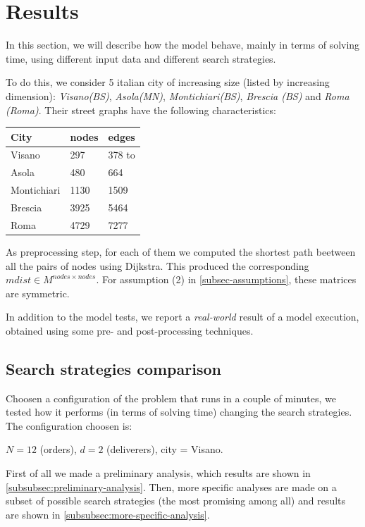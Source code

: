 \documentclass[10pt]{article}
\begin{document}
	\section{Results}
	\label{Results}

	In this section, we will describe how the model behave, mainly in terms of solving
	time, using different input data and different search strategies.

	To do this, we consider 5 italian city of increasing size (listed by increasing dimension): 
	\textit{Visano(BS)}, \textit{Asola(MN)}, \textit{Montichiari(BS)}, \textit{Brescia (BS)} and \textit{Roma (Roma)}.
	Their street graphs have the following characteristics:%
	\begin{table}[h]
		\centering
		\begin{tabular}{l|ll}
			City & nodes & edges \\
			\hline
			Visano & 297 & 378 to\\
			Asola & 480 & 664 \\
			Montichiari & 1130 & 1509 \\
			Brescia & 3925 & 5464 \\
			Roma & 4729 & 7277 \\
		\end{tabular}		
	\end{table}
	
	As preprocessing step, for each of them we computed the shortest path beetween all the pairs
	of nodes using Dijkstra. This produced the corresponding $mdist \in M^{nodes \times nodes}$.
	For assumption (2) in \cref{subsec-assumptions}, these matrices are symmetric.

	In addition to the model tests, we report a \textit{real-world} result of a model execution, obtained using some pre- and post-processing techniques.  

	\subsection{Search strategies comparison}
	\label{subsec:test-strategies}
	Choosen a configuration of the problem that runs in a couple of minutes,
	we tested how it performs (in terms of solving time) changing the search strategies.
	The configuration choosen is:
	\begin{center}
		$N = 12$ (orders), $d = 2$ (deliverers), city = Visano.		
	\end{center}

	First of all we made a preliminary analysis, which results are shown in
	\cref{subsubsec:preliminary-analysis}. Then, more specific analyses
	are made on a subset of possible search strategies (the most promising among all)
	and results are shown in \cref{subsubsec:more-specific-analysis}.
\end{document}
